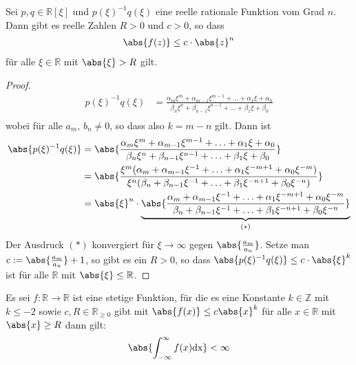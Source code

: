 \begin{lemma}\label{lem:absch}
Sei $p, q \in \mathbb{R}[\xi]$ und $p(\xi)^{-1}q(\xi)$ eine reelle rationale Funktion vom Grad $n$. Dann gibt es reelle Zahlen $R > 0$ und $c > 0$, so dass 
\begin{align}
	\abs{f(z)} \leq c \cdot \abs{z}^n
\end{align}
für alle $\xi \in \mathbb{R}$ mit $\abs{\xi} > R$ gilt.
\begin{proof}
\begin{align}
	p(\xi)^{-1}q(\xi) &=  \frac{\alpha_m \xi^m + \alpha_{m-1} \xi^{m-1} + \hdots +  \alpha_1 \xi + \alpha_0}
		{\beta_n \xi^n + \beta_{n-1} \xi^{n-1} + \hdots +  \beta_1 \xi + \beta_0}\\
\end{align}
wobei für alle $a_m$, $b_n \neq 0$, so dass also $k=m-n$ gilt. Dann ist
\begin{align}
	\abs{p(\xi)^{-1}q(\xi)} &= \abs{\frac{\alpha_m \xi^m + \alpha_{m-1} \xi^{m-1} + \hdots +  \alpha_1 \xi + \alpha_0}
		{\beta_n \xi^n + \beta_{n-1} \xi^{n-1} + \hdots +  \beta_1 \xi + \beta_0}} \\
		&= \abs{\frac{ \xi^m(\alpha_m  + \alpha_{m-1} \xi^{-1} + \hdots +  \alpha_1 \xi^{-m+1} + \alpha_0 \xi^{-m})}
		{\xi^n (\beta_n  + \beta_{n-1} \xi^{-1} + \hdots +  \beta_1 \xi^{-n+1} + \beta_0 \xi^{-n})}}\\
		&= \abs{\xi}^n \cdot \underbrace{\abs{\frac{\alpha_m  + \alpha_{m-1} \xi^{-1} + \hdots +  \alpha_1 \xi^{-m+1} + \alpha_0 \xi^{-m}}{\beta_n  + \beta_{n-1} \xi^{-1} + \hdots +  \beta_1 \xi^{-n+1} + \beta_0 \xi^{-n}}}}_{(*)}
\end{align}
Der Ausdruck $(*)$ konvergiert für $\xi \rightarrow \infty$ gegen $\abs{\frac{a_m}{a_n}}$. Setze man $c:=\abs{\frac{a_m}{a_n}} + 1$, so gibt es ein $R > 0$, so dass $\abs{p(\xi)^{-1}q(\xi)} \leq c \cdot \abs{\xi}^k$ ist für alle $\mathbb{R}$ mit $\abs{\xi} \leq \mathbb{R}$.
\end{proof}
\end{lemma}
\begin{lemma}\label{lem:deg2}
Es sei $f: \mathbb{R} \rightarrow \mathbb{R}$ ist eine stetige Funktion, für die es eine Konstante $k \in \mathbb{Z}$ mit $k \leq -2$ sowie $c, R \in \mathbb{R}_{\geq 0}$ gibt mit $\abs{f(x)} \leq c \abs{x}^k$ für alle $x \in \mathbb{R}$ mit $\abs{x} \geq R$ dann gilt:
\begin{align}
	\abs{\int_{-\infty}^{\infty} f(x) \mathrm{dx}} < \infty 
\end{align} 
\end{lemma}
